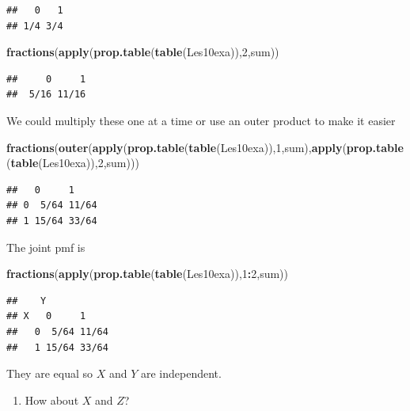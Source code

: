 \documentclass[]{book}
\newenvironment{Shaded}{\begin{snugshade}}{\end{snugshade}}
\newcommand{\KeywordTok}[1]{\textcolor[rgb]{0.13,0.29,0.53}{\textbf{#1}}}
\newcommand{\DecValTok}[1]{\textcolor[rgb]{0.00,0.00,0.81}{#1}}
\newcommand{\OperatorTok}[1]{\textcolor[rgb]{0.81,0.36,0.00}{\textbf{#1}}}
\newcommand{\NormalTok}[1]{#1}
\providecommand{\tightlist}{%
  \setlength{\itemsep}{0pt}\setlength{\parskip}{0pt}}
\theoremstyle{definition}
\theoremstyle{definition}
\theoremstyle{definition}
\theoremstyle{remark}
\begin{document}
\begin{verbatim}
##   0   1 
## 1/4 3/4
\end{verbatim}

\begin{Shaded}
\begin{Highlighting}[]
\KeywordTok{fractions}\NormalTok{(}\KeywordTok{apply}\NormalTok{(}\KeywordTok{prop.table}\NormalTok{(}\KeywordTok{table}\NormalTok{(Les10exa)),}\DecValTok{2}\NormalTok{,sum))}
\end{Highlighting}
\end{Shaded}

\begin{verbatim}
##     0     1 
##  5/16 11/16
\end{verbatim}

We could multiply these one at a time or use an outer product to make it
easier

\begin{Shaded}
\begin{Highlighting}[]
\KeywordTok{fractions}\NormalTok{(}\KeywordTok{outer}\NormalTok{(}\KeywordTok{apply}\NormalTok{(}\KeywordTok{prop.table}\NormalTok{(}\KeywordTok{table}\NormalTok{(Les10exa)),}\DecValTok{1}\NormalTok{,sum),}\KeywordTok{apply}\NormalTok{(}\KeywordTok{prop.table}\NormalTok{(}\KeywordTok{table}\NormalTok{(Les10exa)),}\DecValTok{2}\NormalTok{,sum)))}
\end{Highlighting}
\end{Shaded}

\begin{verbatim}
##   0     1    
## 0  5/64 11/64
## 1 15/64 33/64
\end{verbatim}

The joint pmf is

\begin{Shaded}
\begin{Highlighting}[]
\KeywordTok{fractions}\NormalTok{(}\KeywordTok{apply}\NormalTok{(}\KeywordTok{prop.table}\NormalTok{(}\KeywordTok{table}\NormalTok{(Les10exa)),}\DecValTok{1}\OperatorTok{:}\DecValTok{2}\NormalTok{,sum))}
\end{Highlighting}
\end{Shaded}

\begin{verbatim}
##    Y
## X   0     1    
##   0  5/64 11/64
##   1 15/64 33/64
\end{verbatim}

They are equal so \(X\) and \(Y\) are independent.

\begin{enumerate}
\def\labelenumi{\arabic{enumi}.}
\setcounter{enumi}{4}
\tightlist
\item
  How about \(X\) and \(Z\)?
\end{enumerate}
\end{document}
